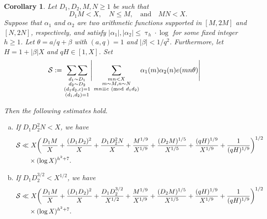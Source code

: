 \documentclass[12pt]{amsart}
\numberwithin{equation}{section}
\newtheorem{cor}[theorem]{Corollary}
\theoremstyle{remark}
\theoremstyle{definition}
\newcommand{\imod}[1]{\ (\mathrm{mod}\ #1)}
\begin{document}
\begin{cor}\label{Cor: D_1D_2ii}
Let $D_1, D_2, M, N\geq 1$ be such that 
\[D_1M<X, \quad N\leq M, \quad \text{and} \quad MN<X.\] Suppose that ${\alpha}_1$ and ${\alpha}_2$ are two arithmetic functions supported in $[M, 2M]$ and $[N, 2N]$, respectively, and satisfy $|{\alpha}_1|, |{\alpha}_2|\leq \uptau_h\cdot  \log$ for some fixed integer $h\geq 1$. Let $\theta=a/q+\beta$ with $(a, q)=1$ and $|\beta|<1/q^2$. Furthermore, let $H=1+|\beta|X$ and $qH\in [1, X]$. Set
\begin{align}
\notag \mathcal{S}:= \notag \mathop{\sum\sum}_{\substack{d_1\sim D_1\\d_2\sim D_2\\(d_1d_2, c)=1\\(d_1,d_2)=1}}&\Bigg\lvert\sum_{\substack{mn <X\\m\sim M, n\sim N\\mn\equiv c\imod {d_1d_2}}}{\alpha}_1(m){\alpha}_2(n)e(mn\theta)\Bigg\rvert 
\end{align}

Then the following estimates hold.
\begin{enumerate}[(a)]
\item If $D_1D_2^2N<X$, we have
\begin{align}
\notag \mathcal{S}\ll &~X\bigg(\dfrac{D_1M}{X} + \dfrac{(D_1D_2)^2}{X} + \dfrac{D_1D_2^2N}{X} + \dfrac{M^{1/9}}{X^{1/9}}+ \dfrac{(D_2M)^{1/5}}{X^{1/5}}+\dfrac{(qH)^{1/9}}{X^{1/9}} + \dfrac{1}{(qH)^{1/9}}\bigg)^{1/2}\\
\notag &\times (\log X)^{h^2+7}.
\end{align}
\item If $D_1D_2^{3/2}< X^{1/2}$, we have
\begin{align}
\notag \mathcal{S}\ll &~X\bigg(\dfrac{D_1M}{X} + \dfrac{(D_1D_2)^2}{X} + \dfrac{D_1D_2^{3/2}}{X^{1/2}} + \dfrac{M^{1/9}}{X^{1/9}}+ \dfrac{(D_2M)^{1/5}}{X^{1/5}}+\dfrac{(qH)^{1/9}}{X^{1/9}} + \dfrac{1}{(qH)^{1/9}}\bigg)^{1/2}\\
\notag &\times (\log X)^{h^2+7}.
\end{align}
\end{enumerate}

\end{cor}
\end{document}
